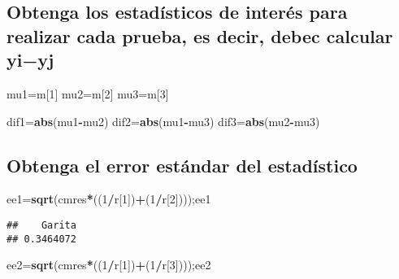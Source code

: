 \documentclass[
]{article}
\newenvironment{Shaded}{\begin{snugshade}}{\end{snugshade}}
\newcommand{\DecValTok}[1]{\textcolor[rgb]{0.00,0.00,0.81}{#1}}
\newcommand{\FunctionTok}[1]{\textcolor[rgb]{0.13,0.29,0.53}{\textbf{#1}}}
\newcommand{\NormalTok}[1]{#1}
\newcommand{\OtherTok}[1]{\textcolor[rgb]{0.56,0.35,0.01}{#1}}
\newcommand{\SpecialCharTok}[1]{\textcolor[rgb]{0.81,0.36,0.00}{\textbf{#1}}}
\begin{document}
\hypertarget{obtenga-los-estaduxedsticos-de-interuxe9s-para-realizar-cada-prueba-es-decir-debec-calcular-yiyj}{%
\subsection{Obtenga los estadísticos de interés para realizar cada
prueba, es decir, debec calcular
yi−yj}\label{obtenga-los-estaduxedsticos-de-interuxe9s-para-realizar-cada-prueba-es-decir-debec-calcular-yiyj}}

\begin{Shaded}
\begin{Highlighting}[]
\NormalTok{mu1}\OtherTok{=}\NormalTok{m[}\DecValTok{1}\NormalTok{]}
\NormalTok{mu2}\OtherTok{=}\NormalTok{m[}\DecValTok{2}\NormalTok{]}
\NormalTok{mu3}\OtherTok{=}\NormalTok{m[}\DecValTok{3}\NormalTok{]}

\NormalTok{dif1}\OtherTok{=}\FunctionTok{abs}\NormalTok{(mu1}\SpecialCharTok{{-}}\NormalTok{mu2)}
\NormalTok{dif2}\OtherTok{=}\FunctionTok{abs}\NormalTok{(mu1}\SpecialCharTok{{-}}\NormalTok{mu3)}
\NormalTok{dif3}\OtherTok{=}\FunctionTok{abs}\NormalTok{(mu2}\SpecialCharTok{{-}}\NormalTok{mu3)}
\end{Highlighting}
\end{Shaded}

\hypertarget{obtenga-el-error-estuxe1ndar-del-estaduxedstico}{%
\subsection{Obtenga el error estándar del
estadístico}\label{obtenga-el-error-estuxe1ndar-del-estaduxedstico}}

\begin{Shaded}
\begin{Highlighting}[]
\NormalTok{ee1}\OtherTok{=}\FunctionTok{sqrt}\NormalTok{(cmres}\SpecialCharTok{*}\NormalTok{((}\DecValTok{1}\SpecialCharTok{/}\NormalTok{r[}\DecValTok{1}\NormalTok{])}\SpecialCharTok{+}\NormalTok{(}\DecValTok{1}\SpecialCharTok{/}\NormalTok{r[}\DecValTok{2}\NormalTok{])));ee1}
\end{Highlighting}
\end{Shaded}

\begin{verbatim}
##    Garita 
## 0.3464072
\end{verbatim}

\begin{Shaded}
\begin{Highlighting}[]
\NormalTok{ee2}\OtherTok{=}\FunctionTok{sqrt}\NormalTok{(cmres}\SpecialCharTok{*}\NormalTok{((}\DecValTok{1}\SpecialCharTok{/}\NormalTok{r[}\DecValTok{1}\NormalTok{])}\SpecialCharTok{+}\NormalTok{(}\DecValTok{1}\SpecialCharTok{/}\NormalTok{r[}\DecValTok{3}\NormalTok{])));ee2}
\end{Highlighting}
\end{Shaded}
\end{document}
